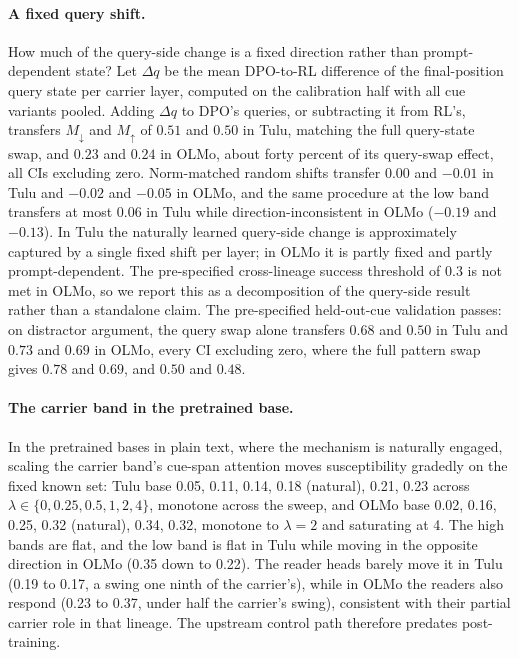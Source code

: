 \documentclass{article}
\begin{document}
\paragraph{A fixed query shift.} How much of the query-side change is a fixed direction rather than prompt-dependent state? Let $\Delta q$ be the mean DPO-to-RL difference of the final-position query state per carrier layer, computed on the calibration half with all cue variants pooled. Adding $\Delta q$ to DPO's queries, or subtracting it from RL's, transfers $M_\downarrow$ and $M_\uparrow$ of $0.51$ and $0.50$ in Tulu, matching the full query-state swap, and $0.23$ and $0.24$ in OLMo, about forty percent of its query-swap effect, all CIs excluding zero. Norm-matched random shifts transfer $0.00$ and $-0.01$ in Tulu and $-0.02$ and $-0.05$ in OLMo, and the same procedure at the low band transfers at most $0.06$ in Tulu while direction-inconsistent in OLMo ($-0.19$ and $-0.13$). In Tulu the naturally learned query-side change is approximately captured by a single fixed shift per layer; in OLMo it is partly fixed and partly prompt-dependent. The pre-specified cross-lineage success threshold of $0.3$ is not met in OLMo, so we report this as a decomposition of the query-side result rather than a standalone claim. The pre-specified held-out-cue validation passes: on distractor argument, the query swap alone transfers $0.68$ and $0.50$ in Tulu and $0.73$ and $0.69$ in OLMo, every CI excluding zero, where the full pattern swap gives $0.78$ and $0.69$, and $0.50$ and $0.48$.

\paragraph{The carrier band in the pretrained base.} In the pretrained bases in plain text, where the mechanism is naturally engaged, scaling the carrier band's cue-span attention moves susceptibility gradedly on the fixed known set: Tulu base 0.05, 0.11, 0.14, 0.18 (natural), 0.21, 0.23 across $\lambda \in \{0, 0.25, 0.5, 1, 2, 4\}$, monotone across the sweep, and OLMo base 0.02, 0.16, 0.25, 0.32 (natural), 0.34, 0.32, monotone to $\lambda = 2$ and saturating at 4. The high bands are flat, and the low band is flat in Tulu while moving in the opposite direction in OLMo (0.35 down to 0.22). The reader heads barely move it in Tulu (0.19 to 0.17, a swing one ninth of the carrier's), while in OLMo the readers also respond (0.23 to 0.37, under half the carrier's swing), consistent with their partial carrier role in that lineage. The upstream control path therefore predates post-training.
\end{document}
